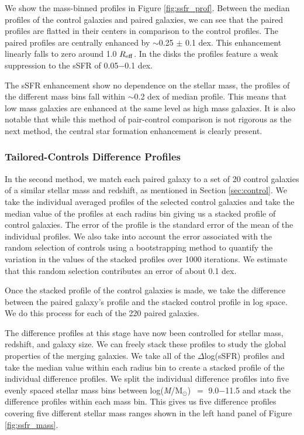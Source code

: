 \documentclass[iop,revtex4,twocolumn,apj,numberedappendix,appendixfloats]{emulateapj}
\newcommand{\reff}{$R_{\rm eff}$}
\newcommand{\logm}{log({\it M}/M$_{\odot}$)}
\begin{document}
We show the mass-binned profiles in Figure \ref{fig:ssfr_prof}. Between the median profiles of the control galaxies and paired galaxies, we can see that the paired profiles are flatted in their centers in comparison to the control profiles. The paired profiles are centrally enhanced by $\sim$0.25 $\pm$ 0.1 dex. This enhancement linearly falls to zero around 1.0 \reff. In the disks the profiles feature a weak suppression to the sSFR of 0.05$-$0.1 dex. 

The sSFR enhancement show no dependence on the stellar mass, the profiles of the different mass bins fall within $\sim$0.2 dex of median profile. This means that low mass galaxies are enhanced at the same level as high mass galaxies. It is also notable that while this method of pair-control comparison is not rigorous as the next method, the central star formation enhancement is clearly present.

\subsubsection{Tailored-Controls Difference Profiles}\label{sec:tailored}

In the second method, we match each paired galaxy to a set of 20 control galaxies of a similar stellar mass and redshift, as mentioned in Section \ref{sec:control}. We take the individual averaged profiles of the selected control galaxies and take the median value of the profiles at each radius bin giving us a stacked profile of control galaxies. The error of the profile is the standard error of the mean of the individual profiles. We also take into account the error associated with the random selection of controls using a bootstrapping method to quantify the variation in the values of the stacked profiles over 1000 iterations. We estimate that this random selection contributes an error of about 0.1 dex.

Once the stacked profile of the control galaxies is made, we take the difference between the paired galaxy's profile and the stacked control profile in log space. We do this process for each of the 220 paired galaxies. 

The difference profiles at this stage have now been controlled for stellar mass, redshift, and galaxy size. We can freely stack these profiles to study the global properties of the merging galaxies. We take all of the $\Delta$log(sSFR) profiles and take the median value within each radius bin to create a stacked profile of the individual difference profiles. We split the individual difference profiles into five evenly spaced stellar mass bins between \logm\ $=$ 9.0$-$11.5 and stack the difference profiles within each mass bin. This gives us five difference profiles covering five different stellar mass ranges shown in the left hand panel of Figure \ref{fig:ssfr_mass}. 
\end{document}
